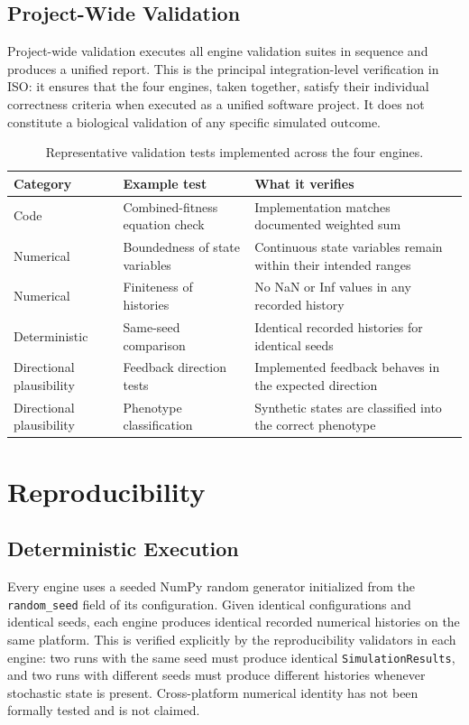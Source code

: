 \documentclass[12pt,a4paper]{article}
\begin{document}
\subsection{Project-Wide Validation}

Project-wide validation executes all engine validation suites in sequence and produces a unified report. This is the principal integration-level verification in ISO: it ensures that the four engines, taken together, satisfy their individual correctness criteria when executed as a unified software project. It does not constitute a biological validation of any specific simulated outcome.

\begin{table}[H]
\centering
\caption{Representative validation tests implemented across the four engines.}
\label{tab:validation}
\begin{tabular}{p{3.0cm} p{4.6cm} p{5.6cm}}
\toprule
\textbf{Category} & \textbf{Example test} & \textbf{What it verifies} \\
\midrule
Code & Combined-fitness equation check & Implementation matches documented weighted sum \\
Numerical & Boundedness of state variables & Continuous state variables remain within their intended ranges \\
Numerical & Finiteness of histories & No NaN or Inf values in any recorded history \\
Deterministic & Same-seed comparison & Identical recorded histories for identical seeds \\
Directional plausibility & Feedback direction tests & Implemented feedback behaves in the expected direction \\
Directional plausibility & Phenotype classification & Synthetic states are classified into the correct phenotype \\
\bottomrule
\end{tabular}
\end{table}

\section{Reproducibility}

\subsection{Deterministic Execution}

Every engine uses a seeded NumPy random generator initialized from the \texttt{random\_seed} field of its configuration. Given identical configurations and identical seeds, each engine produces identical recorded numerical histories on the same platform. This is verified explicitly by the reproducibility validators in each engine: two runs with the same seed must produce identical \texttt{SimulationResults}, and two runs with different seeds must produce different histories whenever stochastic state is present. Cross-platform numerical identity has not been formally tested and is not claimed.
\end{document}
